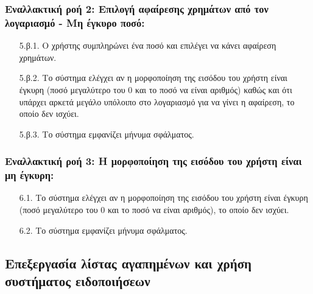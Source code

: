 \documentclass[12pt,a4paper]{article}
\begin{document}
\subsubsection*{Εναλλακτική ροή 2: Επιλογή αφαίρεσης χρημάτων από τον λογαριασμό - Μη έγκυρο ποσό:}
\begin{enumerate}
    \item [5.β.1.] Ο χρήστης συμπληρώνει ένα ποσό και επιλέγει να κάνει αφαίρεση χρημάτων.
    \item [5.β.2.] Το σύστημα ελέγχει αν η μορφοποίηση της εισόδου του χρήστη είναι έγκυρη (ποσό μεγαλύτερο του 0 και το ποσό να είναι αριθμός) καθώς και ότι υπάρχει αρκετά μεγάλο υπόλοιπο στο λογαριασμό για να γίνει η αφαίρεση, το οποίο δεν ισχύει.
    \item [5.β.3.] Το σύστημα εμφανίζει μήνυμα σφάλματος.
\end{enumerate}

\subsubsection*{Εναλλακτική ροή 3: Η μορφοποίηση της εισόδου του χρήστη είναι μη έγκυρη:}
\begin{enumerate}
    \item [6.1.] Το σύστημα ελέγχει αν η μορφοποίηση της εισόδου του χρήστη είναι έγκυρη (ποσό μεγαλύτερο του 0 και το ποσό να είναι αριθμός), το οποίο δεν ισχύει.
    \item [6.2.] Το σύστημα εμφανίζει μήνυμα σφάλματος.
\end{enumerate}

\subsection{Επεξεργασία λίστας αγαπημένων και χρήση \\συστήματος ειδοποιήσεων}
\end{document}
